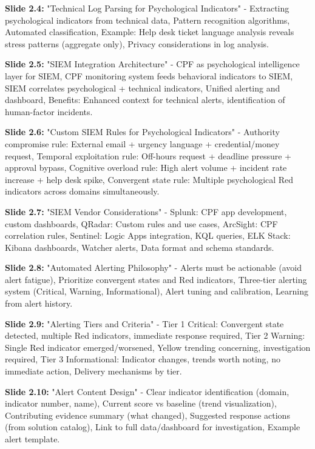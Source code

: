 \documentclass[11pt,a4paper]{article}
\begin{document}
\textbf{Slide 2.4:} "Technical Log Parsing for Psychological Indicators" - Extracting psychological indicators from technical data, Pattern recognition algorithms, Automated classification, Example: Help desk ticket language analysis reveals stress patterns (aggregate only), Privacy considerations in log analysis.

\textbf{Slide 2.5:} "SIEM Integration Architecture" - CPF as psychological intelligence layer for SIEM, CPF monitoring system feeds behavioral indicators to SIEM, SIEM correlates psychological + technical indicators, Unified alerting and dashboard, Benefits: Enhanced context for technical alerts, identification of human-factor incidents.

\textbf{Slide 2.6:} "Custom SIEM Rules for Psychological Indicators" - Authority compromise rule: External email + urgency language + credential/money request, Temporal exploitation rule: Off-hours request + deadline pressure + approval bypass, Cognitive overload rule: High alert volume + incident rate increase + help desk spike, Convergent state rule: Multiple psychological Red indicators across domains simultaneously.

\textbf{Slide 2.7:} "SIEM Vendor Considerations" - Splunk: CPF app development, custom dashboards, QRadar: Custom rules and use cases, ArcSight: CPF correlation rules, Sentinel: Logic Apps integration, KQL queries, ELK Stack: Kibana dashboards, Watcher alerts, Data format and schema standards.

\textbf{Slide 2.8:} "Automated Alerting Philosophy" - Alerts must be actionable (avoid alert fatigue), Prioritize convergent states and Red indicators, Three-tier alerting system (Critical, Warning, Informational), Alert tuning and calibration, Learning from alert history.

\textbf{Slide 2.9:} "Alerting Tiers and Criteria" - Tier 1 Critical: Convergent state detected, multiple Red indicators, immediate response required, Tier 2 Warning: Single Red indicator emerged/worsened, Yellow trending concerning, investigation required, Tier 3 Informational: Indicator changes, trends worth noting, no immediate action, Delivery mechanisms by tier.

\textbf{Slide 2.10:} "Alert Content Design" - Clear indicator identification (domain, indicator number, name), Current score vs baseline (trend visualization), Contributing evidence summary (what changed), Suggested response actions (from solution catalog), Link to full data/dashboard for investigation, Example alert template.
\end{document}
